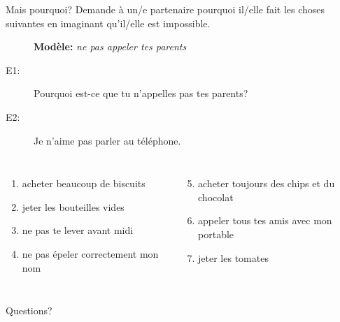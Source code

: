 \documentclass{beamer}
\begin{document}
  \begin{frame}{Mais pourquoi?}
    Demande à un/e partenaire pourquoi il/elle fait les choses suivantes en imaginant qu'il/elle est impossible. \\
    \begin{description}
      \item[] \textbf{Modèle:} \emph{ne pas appeler tes parents}
      \item[E1:] Pourquoi est-ce que tu n'appelles pas tes parents?
      \item[E2:] Je n'aime pas parler au téléphone.
    \end{description}
    \begin{columns}[t]
        \begin{enumerate}
          \item acheter beaucoup de biscuits
          \item jeter les bouteilles vides 
          \item ne pas te lever avant midi
          \item ne pas épeler correctement mon nom
        \end{enumerate}
        \begin{enumerate}
          \setcounter{enumi}{4}
          \item acheter toujours des chips et du chocolat
          \item appeler tous tes amis avec mon portable
          \item jeter les tomates
        \end{enumerate}
    \end{columns}
  \end{frame}

  \begin{frame}{}
    \begin{center}
      \Large Questions?
    \end{center}
  \end{frame}
\end{document}
